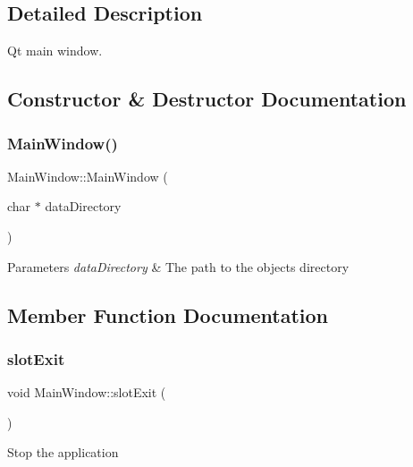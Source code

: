 \subsection{Detailed Description}
Qt main window. 

\subsection{Constructor \& Destructor Documentation}
\mbox{\label{classMainWindow_a06c3eabf20b0ef52c0b33208334e8e1f}} 
\subsubsection{\texorpdfstring{Main\+Window()}{MainWindow()}}
{\footnotesize\ttfamily Main\+Window\+::\+Main\+Window (\begin{DoxyParamCaption}\item[{char $\ast$}]{data\+Directory }\end{DoxyParamCaption})}


\begin{DoxyParams}{Parameters}
{\em data\+Directory} & The path to the objects directory \\
\hline
\end{DoxyParams}


\subsection{Member Function Documentation}
\mbox{\label{classMainWindow_aca3b7226e638a0cd5ef9d7db749ff67e}} 
\subsubsection{\texorpdfstring{slot\+Exit}{slotExit}}
{\footnotesize\ttfamily void Main\+Window\+::slot\+Exit (\begin{DoxyParamCaption}{ }\end{DoxyParamCaption})\hspace{0.3cm}{\ttfamily [slot]}}

Stop the application \mbox{\label{classMainWindow_ab2c27d510eabe77a0eb11fc091adc293}} 
